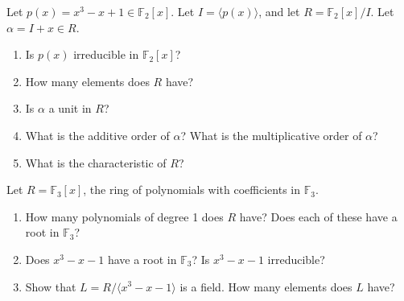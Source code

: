 \documentclass[12pt,letterpaper,boxed]{hmcpset}
\begin{document}
\begin{solution}
\end{solution}

\clearpage

\begin{problem}[19.3.5]
Let $p(x) = x^3 - x + 1 \in \mathbb{F}_2[x]$. Let $I = \langle p(x) \rangle$, and let $R = \mathbb{F}_2[x]/I$. Let $\alpha = I + x \in R$.
\begin{enumerate}[label=\alph*]
\item Is $p(x)$ irreducible in $\mathbb{F}_2[x]$?
\item How many elements does $R$ have?
\item Is $\alpha$ a unit in $R$?
\item What is the additive order of $\alpha$? What is the multiplicative order of $\alpha$?
\item What is the characteristic of $R$?
\end{enumerate}
\end{problem}

\begin{solution}
\end{solution}

\clearpage

\begin{problem}[19.3.11]
Let $R = \mathbb{F}_3[x]$, the ring of polynomials with coefficients in $\mathbb{F}_3$.
\begin{enumerate}[label=\alph*]
\item How many polynomials of degree 1 does $R$ have? Does each of these have a root in $\mathbb{F}_3$?
\item Does $x^3 - x - 1$ have a root in $\mathbb{F}_3$? Is $x^3 - x - 1$ irreducible?
\item Show that $L = R/\langle x^3 - x - 1 \rangle$ is a field. How many elements does $L$ have?
\end{enumerate}
\end{problem}

\begin{solution}
\end{solution}
\end{document}
